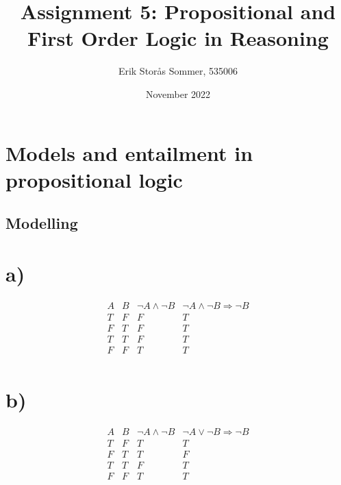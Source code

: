 \documentclass{article}
\title{Assignment 5: Propositional and First Order Logic in Reasoning}
\author{Erik Storås Sommer, 535006}
\date{November 2022}
\begin{document}
\maketitle

\section{Models and entailment in propositional logic}

\subsection{Modelling}

\section*{a)}
\begin{displaymath}
\begin{array}{|c|c|c|c|c}

A & 
B & 
\neg A \wedge \neg B &
\neg A \wedge \neg B \Rightarrow \neg B\\ %
\hline  %
T & F & F & T\\
F & T & F & T\\
T & T & F & T\\
F & F & T & T\\

\end{array}
\end{displaymath}


\section*{b)}
\begin{displaymath}
\begin{array}{|c|c|c|c|c}

A &
B & 
\neg A \wedge \neg B &
\neg A \vee \neg B \Rightarrow \neg B\\ %
\hline  %
T & F & T & T\\
F & T & T & F\\
T & T & F & T\\
F & F & T & T\\

\end{array}
\end{displaymath}
\end{document}
